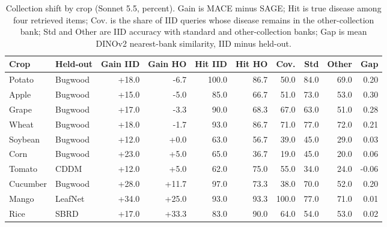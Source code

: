 \begin{table}[t]
\centering\small
\caption{Collection shift by crop (Sonnet 5.5, percent). Gain is MACE minus SAGE; Hit is true disease among four retrieved items; Cov. is the share of IID queries whose disease remains in the other-collection bank; Std and Other are IID accuracy with standard and other-collection banks; Gap is mean DINOv2 nearest-bank similarity, IID minus held-out.}
\label{tab:table_D_summary}
\begin{tabular}{llrrrrrrrr}
\toprule
Crop & Held-out & Gain IID & Gain HO & Hit IID & Hit HO & Cov. & Std & Other & Gap \\
\midrule
Potato & Bugwood & +18.0 & -6.7 & 100.0 & 86.7 & 50.0 & 84.0 & 69.0 & 0.20 \\
Apple & Bugwood & +15.0 & -5.0 & 85.0 & 66.7 & 51.0 & 73.0 & 53.0 & 0.30 \\
Grape & Bugwood & +17.0 & -3.3 & 90.0 & 68.3 & 67.0 & 63.0 & 51.0 & 0.28 \\
Wheat & Bugwood & +18.0 & -1.7 & 93.0 & 86.7 & 71.0 & 77.0 & 72.0 & 0.21 \\
Soybean & Bugwood & +12.0 & +0.0 & 63.0 & 56.7 & 39.0 & 45.0 & 29.0 & 0.03 \\
Corn & Bugwood & +23.0 & +5.0 & 65.0 & 36.7 & 19.0 & 45.0 & 20.0 & 0.06 \\
Tomato & CDDM & +12.0 & +5.0 & 62.0 & 75.0 & 55.0 & 34.0 & 24.0 & -0.06 \\
Cucumber & Bugwood & +28.0 & +11.7 & 97.0 & 73.3 & 38.0 & 70.0 & 52.0 & 0.20 \\
Mango & LeafNet & +34.0 & +25.0 & 93.0 & 93.3 & 100.0 & 77.0 & 71.0 & 0.01 \\
Rice & SBRD & +17.0 & +33.3 & 83.0 & 90.0 & 64.0 & 54.0 & 53.0 & 0.02 \\
\bottomrule
\end{tabular}
\end{table}
